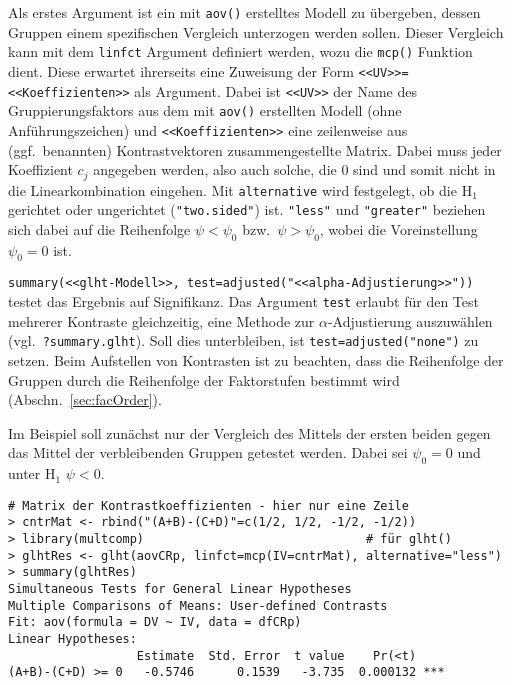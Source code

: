 Als erstes Argument ist ein mit \lstinline!aov()! erstelltes Modell zu übergeben, dessen Gruppen einem spezifischen Vergleich unterzogen werden sollen. Dieser Vergleich kann mit dem \lstinline!linfct! Argument definiert werden, wozu die \lstinline!mcp()! Funktion dient. Diese erwartet ihrerseits eine Zuweisung der Form \lstinline!<<UV>>=<<Koeffizienten>>! als Argument. Dabei ist \lstinline!<<UV>>! der Name des Gruppierungsfaktors aus dem mit \lstinline!aov()! erstellten Modell (ohne Anführungszeichen) und \lstinline!<<Koeffizienten>>! eine zeilenweise aus (ggf.\ benannten) Kontrastvektoren zusammengestellte Matrix. Dabei muss jeder Koeffizient $c_{j}$ angegeben werden, also auch solche, die $0$ sind und somit nicht in die Linearkombination eingehen. Mit \lstinline!alternative! wird festgelegt, ob die $\text{H}_{1}$ gerichtet oder ungerichtet (\lstinline!"two.sided"!) ist. \lstinline!"less"! und \lstinline!"greater"! beziehen sich dabei auf die Reihenfolge $\psi < \psi_{0}$ bzw.\ $\psi > \psi_{0}$, wobei die Voreinstellung $\psi_{0} = 0$ ist.

\lstinline!summary(<<glht-Modell>>, test=adjusted("<<alpha-Adjustierung>>"))! testet das Ergebnis auf Signifikanz. Das Argument \lstinline!test! erlaubt für den Test mehrerer Kontraste gleichzeitig, eine Methode zur $\alpha$-Adjustierung auszuwählen (vgl.\ \lstinline!?summary.glht!). Soll dies unterbleiben, ist \lstinline!test=adjusted("none")! zu setzen. Beim Aufstellen von Kontrasten ist zu beachten, dass die Reihenfolge der Gruppen durch die Reihenfolge der Faktorstufen bestimmt wird (Abschn.\ \ref{sec:facOrder}).

Im Beispiel soll zunächst nur der Vergleich des Mittels der ersten beiden gegen das Mittel der verbleibenden Gruppen getestet werden. Dabei sei $\psi_{0} = 0$ und unter $\text{H}_{1}$ $\psi < 0$.
\begin{lstlisting}
# Matrix der Kontrastkoeffizienten - hier nur eine Zeile
> cntrMat <- rbind("(A+B)-(C+D)"=c(1/2, 1/2, -1/2, -1/2))
> library(multcomp)                               # für glht()
> glhtRes <- glht(aovCRp, linfct=mcp(IV=cntrMat), alternative="less")
> summary(glhtRes)
Simultaneous Tests for General Linear Hypotheses
Multiple Comparisons of Means: User-defined Contrasts
Fit: aov(formula = DV ~ IV, data = dfCRp)
Linear Hypotheses:
                  Estimate  Std. Error  t value    Pr(<t)
(A+B)-(C+D) >= 0   -0.5746      0.1539   -3.735  0.000132 ***
\end{lstlisting}

